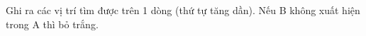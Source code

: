 Ghi ra các vị trí tìm được trên 1 dòng (thứ tự tăng dần). Nếu B không xuất hiện trong A thì bỏ trắng.